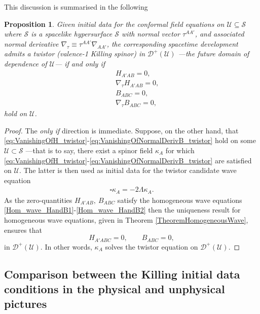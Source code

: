 \documentclass[10pt,a4paper]{article}
\theoremstyle{plain}
\newtheorem{proposition}{Proposition}
\begin{document}
{This discussion is summarised in the following
\begin{proposition}\label{Prop:Propagation_twistor}
  Given initial data for the conformal field equations on $\mathcal{U}\subseteq\mathcal{S}$
  where $\mathcal{S}$ is a spacelike
hypersurface $\mathcal{S}$ with normal vector $\tau^{AA'}$, and
associated normal derivative $\nabla_\tau \equiv
\tau^{AA'}\nabla_{AA'}$, the corresponding spacetime development
admits a twistor (valence-1 Killing spinor) in $\mathcal{D}^{+}(\mathcal{U})$ ---the future domain of dependence of $\mathcal{U}$---  if and only if
\begin{subequations}
\begin{eqnarray}
  && H_{A'AB}=0,\label{eq:VanishingOfH_twistor}\\ && \nabla_\tau
  H_{A'AB}=0,\label{eq:VanishingOfNormalDerivH_twistor}\\ &&
  B_{ABC}=0,\label{eq:VanishingOfB_twistor}\\ &&\nabla_\tau
  B_{ABC}=0, \label{eq:VanishingOfNormalDerivB_twistor}
\end{eqnarray}
\end{subequations}
 hold on $\mathcal{U}$.
\end{proposition}
\begin{proof}
The \emph{only if} direction is immediate. Suppose, on the other hand,
that
\eqref{eq:VanishingOfH_twistor}-\eqref{eq:VanishingOfNormalDerivB_twistor}
hold on some $\mathcal{U}\subset\mathcal{S}$ ---that is to say, there
exist a spinor field $\kappa_{A}$ for which
\eqref{eq:VanishingOfH_twistor}-\eqref{eq:VanishingOfNormalDerivB_twistor}
are satisfied on $\mathcal{U}$. The latter is then used as initial
data for the twistor candidate wave equation
\begin{align} \label{Wave_eq_twistor_candidate_prop}
\square \kappa _{A} = -2 \Lambda \kappa _{A}.
\end{align}
As the zero-quantities $H_{A'AB},~B_{ABC}$ satisfy the homogeneous
wave equations \eqref{Hom_wave_HandB1}-\eqref{Hom_wave_HandB2} then
the uniqueness result for homogeneous wave equations, given in
Theorem \ref{TheoremHomogeneousWave},
ensures that
\[ H_{A'ABC}=0,\qquad B_{ABC}=0,\]
in $\mathcal{D}^{+}(\mathcal{U})$. In other words,
$\kappa_{A}$ solves the twistor equation on $\mathcal{D}^{+}(\mathcal{U})$.
\end{proof}


\subsection{Comparison between the Killing initial data conditions
  in the physical and unphysical pictures}

}
\end{document}
